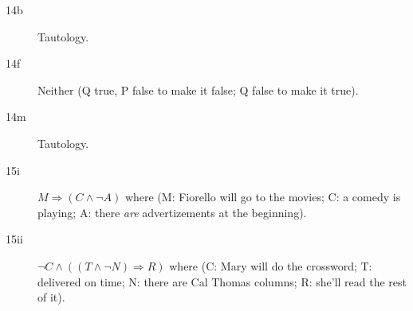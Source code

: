\documentclass[12pt]{article}
\begin{document}
\begin{description}
\item[14b] Tautology.

\item[14f] Neither (Q true, P false to make it false; Q false to make it true).

\item[14m] Tautology.

\item[15i] $M \Rightarrow (C \wedge \neg A)$ where (M: Fiorello will go to the 
           movies; C: a comedy is playing; A: there \textit{are} 
           advertizements at the beginning).

\item[15ii] $\neg C \wedge ((T \wedge \neg N) \Rightarrow R)$ where (C: Mary 
           will do the crossword; T: delivered on time; N: there are Cal Thomas
           columns; R: she'll read the rest of it).

\end{description}
\end{document}
